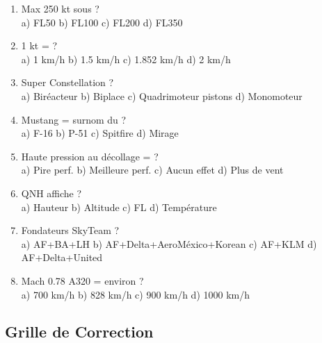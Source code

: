 \begin{enumerate}[nosep, start=81]
\item Max 250 kt sous ? \\ a) FL50 \quad b) FL100 \quad c) FL200 \quad d) FL350

\item 1 kt = ? \\ a) 1 km/h \quad b) 1.5 km/h \quad c) 1.852 km/h \quad d) 2 km/h

\item Super Constellation ? \\ a) Biréacteur \quad b) Biplace \quad c) Quadrimoteur pistons \quad d) Monomoteur

\item Mustang = surnom du ? \\ a) F-16 \quad b) P-51 \quad c) Spitfire \quad d) Mirage

\item Haute pression au décollage = ? \\ a) Pire perf. \quad b) Meilleure perf. \quad c) Aucun effet \quad d) Plus de vent

\item QNH affiche ? \\ a) Hauteur \quad b) Altitude \quad c) FL \quad d) Température

\item Fondateurs SkyTeam ? \\ a) AF+BA+LH \quad b) AF+Delta+AeroMéxico+Korean \quad c) AF+KLM \quad d) AF+Delta+United

\item Mach 0.78 A320 = environ ? \\ a) 700 km/h \quad b) 828 km/h \quad c) 900 km/h \quad d) 1000 km/h
\end{enumerate}

\vspace{1cm}
\subsection*{Grille de Correction}

